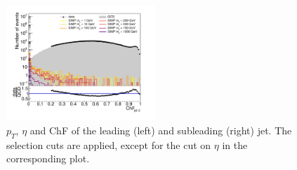 \begin{figure}[ht]
  \includegraphics[width=0.5\textwidth]{figures/jet2chf_neutrons}
  \caption{$p_T$, $\eta$ and ChF of the leading (left) and subleading (right) jet. The selection cuts are applied, except for the cut on $\eta$ in the corresponding plot.}
  \label{fig:event_selection}
\end{figure}

